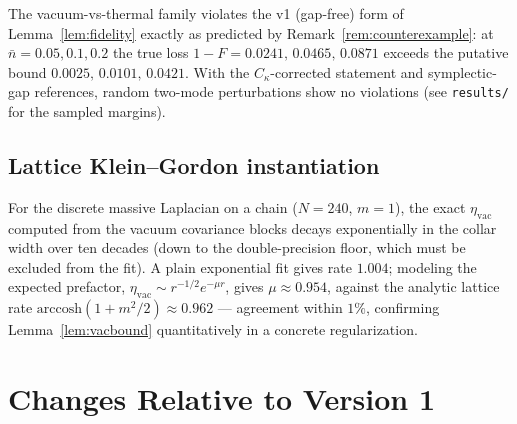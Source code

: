 \documentclass[11pt,a4paper]{article}
\theoremstyle{plain}
\theoremstyle{definition}
\theoremstyle{remark}
\newcommand{\etavac}{\eta_{\mathrm{vac}}}
\newcommand{\Ckappa}{C_{\kappa}}
\begin{document}
The vacuum-vs-thermal family violates the v1 (gap-free) form of
Lemma~\ref{lem:fidelity} exactly as predicted by
Remark~\ref{rem:counterexample}: at $\bar{n} = 0.05, 0.1, 0.2$ the true loss
$1 - F = 0.0241,\, 0.0465,\, 0.0871$ exceeds the putative bound
$0.0025,\, 0.0101,\, 0.0421$. With the $\Ckappa$-corrected statement and
symplectic-gap references, random two-mode perturbations show no violations
(see \texttt{results/} for the sampled margins).

\subsection{Lattice Klein--Gordon instantiation}

For the discrete massive Laplacian on a chain ($N = 240$, $m = 1$), the exact
$\etavac$ computed from the vacuum covariance blocks decays exponentially in the
collar width over ten decades (down to the double-precision floor, which must be
excluded from the fit). A plain exponential fit gives rate $1.004$; modeling the
expected prefactor, $\etavac \sim r^{-1/2}e^{-\mu r}$, gives $\mu \approx 0.954$,
against the analytic lattice rate
$\mathrm{arccosh}(1 + m^2/2) \approx 0.962$ --- agreement within $1\%$,
confirming Lemma~\ref{lem:vacbound} quantitatively in a concrete regularization.

\section{Changes Relative to Version 1}\label{app:changelog}
\end{document}
